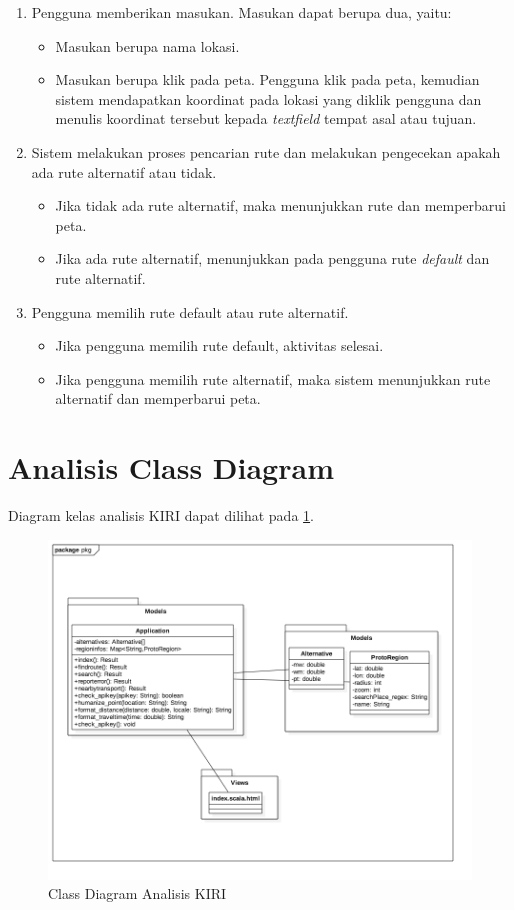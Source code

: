 \begin{enumerate}
	\item Pengguna memberikan masukan. Masukan dapat berupa dua, yaitu:
	\begin{itemize}
		\item Masukan berupa nama lokasi.
		\item Masukan berupa klik pada peta. Pengguna klik pada peta, kemudian sistem mendapatkan koordinat pada lokasi yang diklik pengguna dan menulis koordinat tersebut kepada \textit{textfield} tempat asal atau tujuan.
	\end{itemize}
	\item Sistem melakukan proses pencarian rute dan melakukan pengecekan apakah ada rute alternatif atau tidak.
	\begin{itemize}
		\item Jika tidak ada rute alternatif, maka menunjukkan rute dan memperbarui peta.
		\item Jika ada rute alternatif, menunjukkan pada pengguna rute \textit{default} dan rute alternatif.
	\end{itemize}
	\item Pengguna memilih rute default atau rute alternatif.
	\begin{itemize}
		\item Jika pengguna memilih rute default, aktivitas selesai.
		\item Jika pengguna memilih rute alternatif, maka sistem menunjukkan rute alternatif dan memperbarui peta.
	\end{itemize}
\end{enumerate}


\section{Analisis Class Diagram}
\label{sec:kelasdiagram}
Diagram kelas analisis KIRI dapat dilihat pada \ref{fig:3_classdiagram}.

\begin{figure}[H]
	\centering
	\includegraphics[scale=0.5]{Gambar/Class-Diagram-Analisis}
	\caption{Class Diagram Analisis KIRI} 
	\label{fig:3_classdiagram}
\end{figure}

